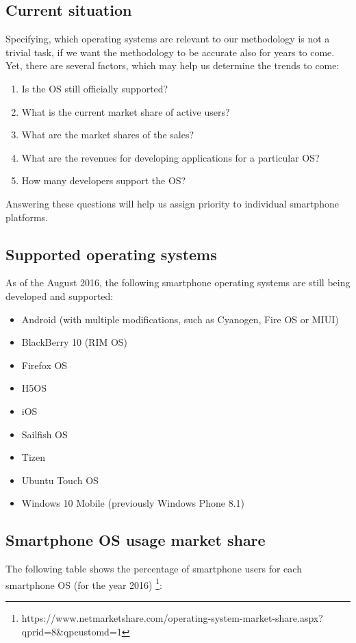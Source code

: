 \documentclass[english,master,public,dept460,male,cpdeclaration,oneside]{diploma}
\begin{document}
\subsection{Current situation}
Specifying, which operating systems are relevant to our methodology is not a trivial task, if we want the methodology to be accurate also for years to come. Yet, there are several factors, which may help us determine the trends to come:
\begin{enumerate}
	\item Is the OS still officially supported?
	\item What is the current market share of active users?
	\item What are the market shares of the sales?
	\item What are the revenues for developing applications for a particular OS?
	\item How many developers support the OS?
\end{enumerate}
Answering these questions will help us assign priority to individual smartphone platforms. 

\subsection{Supported operating systems}
As of the August 2016, the following smartphone operating systems are still being developed and supported: 
\begin{itemize}
	\item Android (with multiple modifications, such as Cyanogen, Fire OS or MIUI)
	\item BlackBerry 10 (RIM OS)
	\item Firefox OS
	\item H5OS
	\item iOS
	\item Sailfish OS
	\item Tizen
	\item Ubuntu Touch OS
	\item Windows 10 Mobile (previously Windows Phone 8.1)
\end{itemize}

\subsection{Smartphone OS usage market share}
The following table shows the percentage of smartphone users for each smartphone OS (for the year 2016) \footnote{https://www.netmarketshare.com/operating-system-market-share.aspx?qprid=8\&qpcustomd=1}:
\end{document}

